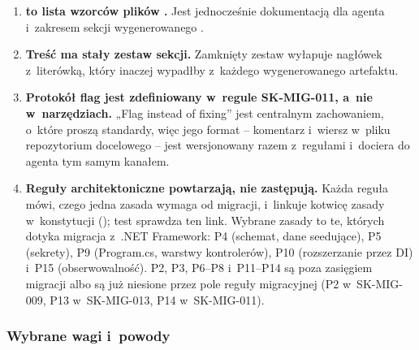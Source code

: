 \begin{enumerate}
        której zbudowane jest demo -- nie mają reguły Portcullis, ale .NET SDK dostarcza dla
        nich analyzery (CA1310, CA1304, CA1305, CA1311), domyślnie wyłączone. Mapowanie ich
        z~tego samego źródła wprowadza reguły NLS → ICU do konfiguracji bramki bez nowych
        narzędzi (zasada produktu nr 3), więc agent i~build z~tą konfiguracją zgadzają się także
        co do nich ( analyzerów SDK nie uruchamia,
        sekcja~\ref{sec:standardy-wagi-kanaly}). Pole przyjmuje tylko identyfikatory SDK.
  \item \textbf{ to lista wzorców plików .} Jest
        jednocześnie dokumentacją dla agenta i~zakresem sekcji wygenerowanego
        .
  \item \textbf{Treść ma stały zestaw sekcji.} Zamknięty zestaw wyłapuje nagłówek z~literówką,
        który inaczej wypadłby z~każdego wygenerowanego artefaktu.
  \item \textbf{Protokół flag jest zdefiniowany w~regule SK-MIG-011, a~nie w~narzędziach.}
        „Flag instead of fixing” jest centralnym zachowaniem, o~które proszą standardy, więc
        jego format -- komentarz  i~wiersz w~pliku
         repozytorium docelowego -- jest wersjonowany
        razem z~regułami i~dociera do agenta tym samym kanałem.
  \item \textbf{Reguły architektoniczne powtarzają, nie zastępują.} Każda reguła
         mówi, czego jedna zasada wymaga od migracji, i~linkuje kotwicę
        zasady w~konstytucji (); test sprawdza ten link.
        Wybrane zasady to te, których dotyka migracja z~.NET Framework: P4 (schemat, dane
        seedujące), P5 (sekrety), P9 (Program.cs, warstwy kontrolerów), P10 (rozszerzanie przez
        DI) i~P15 (obserwowalność). P2, P3, P6--P8 i~P11--P14 są poza zasięgiem migracji albo
        są już niesione przez pole  reguły migracyjnej (P2 w~SK-MIG-009,
        P13 w~SK-MIG-013, P14 w~SK-MIG-011).
\end{enumerate}

\subsubsection{Wybrane wagi i~powody}

